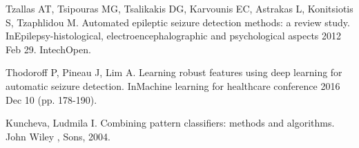 \documentclass{article}
\begin{document}
\begin{small}
\begin{thebibliography}{00}
Tzallas AT, Tsipouras MG, Tsalikakis DG, Karvounis EC, Astrakas L, Konitsiotis S, Tzaphlidou M. Automated epileptic seizure detection methods: a review study. InEpilepsy-histological, electroencephalographic and psychological aspects 2012 Feb 29. IntechOpen.
\vspace{-3pt}

Thodoroff P, Pineau J, Lim A. Learning robust features using deep learning for automatic seizure detection. InMachine learning for healthcare conference 2016 Dec 10 (pp. 178-190).
\vspace{-14pt}










Kuncheva, Ludmila I. Combining pattern classifiers: methods and algorithms. John Wiley , Sons, 2004.
\vspace{-5pt}


\end{thebibliography}
\end{small}



\end{document}
